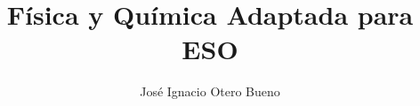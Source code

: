 \documentclass[12pt]{book}
\title{Física y Química Adaptada para ESO}
\author{José Ignacio Otero Bueno}
\begin{document}
	
\maketitle

\tableofcontents



%
%

%


%

\nocite{*}


\end{document}
